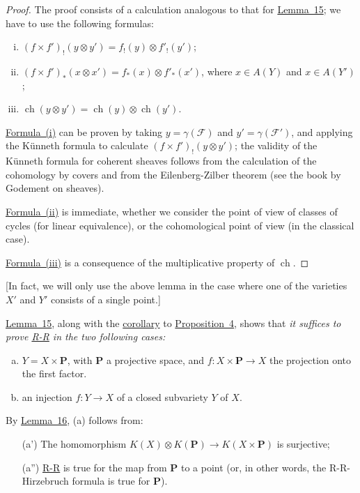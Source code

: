 \documentclass{article}
\newcommand{\scr}[1]{{\mathscr{#1}}}
\newcommand{\PP}{\mathbf{P}}
\DeclareMathOperator{\ch}{ch}
\newcommand{\oldpage}[1]{\marginpar{\footnotesize$\Big\vert$ \textit{p.~#1}}}
\begin{document}
\begin{proof}
  The proof consists of a calculation analogous to that for \hyperref[lemma15]{Lemma~15};
  we have to use the following formulas:
  \begin{enumerate}[(i)]
    \item $(f\times f')_!(y\otimes y') = f_!(y)\otimes f'_!(y')$;
      \label{lemma16equation1}
    \item $(f\times f')_*(x\otimes x') = f_*(x)\otimes f'_*(x')$, where $x\in A(Y)$ and $x\in A(Y')$;
      \label{lemma16equation2}
    \item $\ch(y\otimes y') = \ch(y)\otimes\ch(y')$.
      \label{lemma16equation3}
  \end{enumerate}

  \hyperref[lemma16equation1]{Formula~(i)} can be proven by taking $y=\gamma(\scr{F})$ and $y'=\gamma(\scr{F}')$, and applying the K\"{u}nneth formula to calculate $(f\times f')_!(y\otimes y')$;
  the validity of the K\"{u}nneth formula for coherent sheaves follows from the calculation of the cohomology by covers and from the Eilenberg-Zilber theorem (see the book by Godement on sheaves).

  \hyperref[lemma16equation2]{Formula~(ii)} is immediate, whether we consider the point of view of classes of cycles (for linear equivalence), or the cohomological point of view (in the classical case).

  \oldpage{115}
  \hyperref[lemma16equation3]{Formula~(iii)} is a consequence of the multiplicative property of $\ch$.
\end{proof}

[In fact, we will only use the above lemma in the case where one of the varieties $X'$ and $Y'$ consists of a single point.]

\hyperref[lemma15]{Lemma~15}, along with the \hyperref[corollary5]{corollary} to \hyperref[proposition4]{Proposition~4}, shows that \emph{it suffices to prove \hyperref[theoremriemannroch]{R-R} in the two following cases:}
\begin{enumerate}[(a)]
  \item $Y=X\times\PP$, with $\PP$ a projective space, and $f\colon X\times\PP\to X$ the projection onto the first factor.
  \item an injection $f\colon Y\to X$ of a closed subvariety $Y$ of $X$.
\end{enumerate}

By \hyperref[lemma16]{Lemma~16}, (a) follows from:
\begin{enumerate}
  \item[\rm{(a')}] The homomorphism $K(X)\otimes K(\PP)\to K(X\times\PP)$ is surjective;
  \item[\rm{(a'')}] \hyperref[theoremriemannroch]{R-R} is true for the map from $\PP$ to a point (or, in other words, the R-R-Hirzebruch formula is true for $\PP$).
\end{enumerate}
\end{document}
